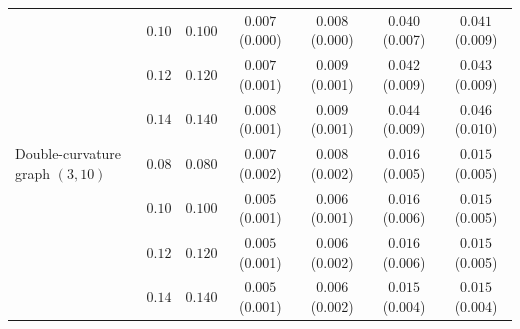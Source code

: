 \begin{tabular}{lcccccc}
 & $0.10$ & $0.100$ & $0.007$ \scriptsize(0.000) & $0.008$ \scriptsize(0.000) & $0.040$ \scriptsize(0.007) & $0.041$ \scriptsize(0.009) \\
 & $0.12$ & $0.120$ & $0.007$ \scriptsize(0.001) & $0.009$ \scriptsize(0.001) & $0.042$ \scriptsize(0.009) & $0.043$ \scriptsize(0.009) \\
 & $0.14$ & $0.140$ & $0.008$ \scriptsize(0.001) & $0.009$ \scriptsize(0.001) & $0.044$ \scriptsize(0.009) & $0.046$ \scriptsize(0.010) \\
\midrule
Double-curvature graph $(3,10)$ & $0.08$ & $0.080$ & $0.007$ \scriptsize(0.002) & $0.008$ \scriptsize(0.002) & $0.016$ \scriptsize(0.005) & $0.015$ \scriptsize(0.005) \\
 & $0.10$ & $0.100$ & $0.005$ \scriptsize(0.001) & $0.006$ \scriptsize(0.001) & $0.016$ \scriptsize(0.006) & $0.015$ \scriptsize(0.005) \\
 & $0.12$ & $0.120$ & $0.005$ \scriptsize(0.001) & $0.006$ \scriptsize(0.002) & $0.016$ \scriptsize(0.006) & $0.015$ \scriptsize(0.005) \\
 & $0.14$ & $0.140$ & $0.005$ \scriptsize(0.001) & $0.006$ \scriptsize(0.002) & $0.015$ \scriptsize(0.004) & $0.015$ \scriptsize(0.004) \\
\bottomrule
\end{tabular}
